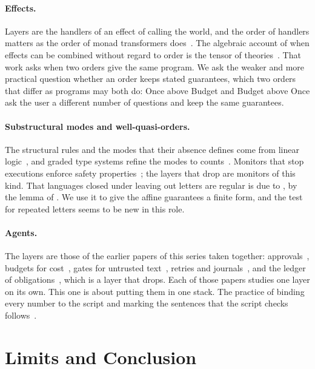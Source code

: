 \documentclass[acmsmall,nonacm,screen]{acmart}
\newcommand{\ly}[1]{\textsf{#1}}
\begin{document}
\paragraph{Effects.} Layers are the handlers of an effect of calling the world, and the
order of handlers matters as the order of monad transformers
does~\cite{liang1995,plotkin2009,kammar2013}. The algebraic account of when effects can be
combined without regard to order is the tensor of theories~\cite{hyland2006}. That work asks
when two orders give the same program. We ask the weaker and more practical question
whether an order keeps stated guarantees, which two orders that differ as programs may both
do: \ly{Once} above \ly{Budget} and \ly{Budget} above \ly{Once} ask the user a different
number of questions and keep the same guarantees.

\paragraph{Substructural modes and well-quasi-orders.} The structural rules and the modes
that their absence defines come from linear logic~\cite{girard1987}, and graded type systems
refine the modes to counts~\cite{orchard2019}. Monitors that stop executions enforce safety
properties~\cite{schneider2000}; the layers that drop are monitors of this kind. That languages
closed under leaving out letters are regular is due to \citet{haines1969}, by the lemma of
\citet{higman1952}. We use it to give the affine guarantees a finite form, and the test for
repeated letters seems to be new in this role.

\paragraph{Agents.} The layers are those of the earlier papers of this series taken
together: approvals~\cite{tpp4}, budgets for cost~\cite{tpp6}, gates for untrusted
text~\cite{tpp7}, retries and journals~\cite{tpp8}, and the ledger of
obligations~\cite{tpp12}, which is a layer that drops. Each of those papers studies one layer
on its own. This one is about putting them in one stack. The practice of binding every number
to the script and marking the sentences that the script checks follows~\cite{tpp10}.

\section{Limits and Conclusion}
\label{sec:limits}
\end{document}
